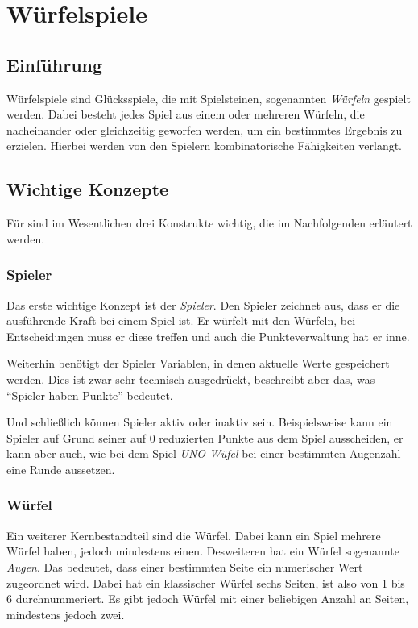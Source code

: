 
\chapter{Würfelspiele}
\label{cha:wurfelspiele}

\section{Einführung}
\label{sec:einfuhrung}
	Würfelspiele sind Glücksspiele, die mit Spielsteinen, sogenannten \emph{Würfeln} gespielt werden. Dabei besteht jedes Spiel aus einem oder mehreren Würfeln, die nacheinander oder gleichzeitig geworfen werden, um ein bestimmtes Ergebnis zu erzielen. Hierbei werden von den Spielern kombinatorische Fähigkeiten verlangt.

\section{Wichtige Konzepte}
\label{sec:wichtige_konzepte}
	Für \dg sind im Wesentlichen drei Konstrukte wichtig, die im Nachfolgenden erläutert werden.

	\subsection{Spieler}
	\label{sub:spieler}
		Das erste wichtige Konzept ist der \emph{Spieler}. Den Spieler zeichnet aus, dass er die ausführende Kraft bei einem Spiel ist. Er würfelt mit den Würfeln, bei Entscheidungen muss er diese treffen und auch die Punkteverwaltung hat er inne.

		Weiterhin benötigt der Spieler Variablen, in denen aktuelle Werte gespeichert werden. Dies ist zwar sehr technisch ausgedrückt, beschreibt aber das, was ``Spieler haben Punkte'' bedeutet.

		Und schließlich können Spieler aktiv oder inaktiv sein. Beispielsweise kann ein Spieler auf Grund seiner auf 0 reduzierten Punkte aus dem Spiel ausscheiden, er kann aber auch, wie bei dem Spiel \emph{UNO Wüfel} bei einer bestimmten Augenzahl eine Runde aussetzen.

	\subsection{Würfel}
	\label{sub:wurfel}
		Ein weiterer Kernbestandteil sind die Würfel. Dabei kann ein Spiel mehrere Würfel haben, jedoch mindestens einen. Desweiteren hat ein Würfel sogenannte \emph{Augen}. Das bedeutet, dass einer bestimmten Seite ein numerischer Wert zugeordnet wird. Dabei hat ein klassischer Würfel sechs Seiten, ist also von 1 bis 6 durchnummeriert. Es gibt jedoch Würfel mit einer beliebigen Anzahl an Seiten, mindestens jedoch zwei.


